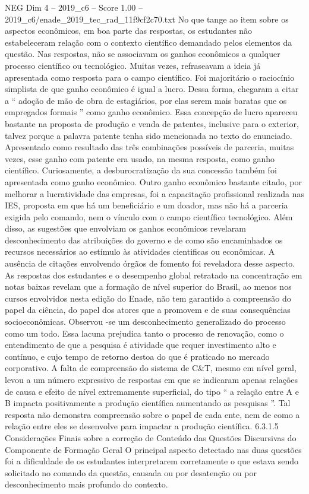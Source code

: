 \begin{textsample}{NEG Dim 4 – 2019\_c6 – Score 1.00 – 2019\_c6/enade\_2019\_tec\_rad\_11f9cf2c70.txt}
No que tange ao item sobre os aspectos econômicos, em boa parte das respostas, os estudantes não estabeleceram relação com o contexto científico demandado pelos elementos da questão.
Nas respostas, não se associavam os ganhos econômicos a qualquer processo científico ou tecnológico.
Muitas vezes, refraseavam a ideia já apresentada como resposta para o campo científico.
Foi majoritário o raciocínio simplista de que ganho econômico é igual a lucro.
Dessa forma, chegaram a citar a “ adoção de mão de obra de estagiários, por elas serem mais baratas que os empregados formais ” como ganho econômico.
Essa concepção de lucro apareceu bastante na proposta de produção e venda de patentes, inclusive para o exterior, talvez porque a palavra patente tenha sido mencionada no texto do enunciado.
Apresentado como resultado das três combinações possíveis de parceria, muitas vezes, esse ganho com patente era usado, na mesma resposta, como ganho científico.
Curiosamente, a desburocratização da sua concessão também foi apresentada como ganho econômico.
Outro ganho econômico bastante citado, por melhorar a lucratividade das empresas, foi a capacitação profissional realizada nas IES, proposta em que há um beneficiário e um doador, mas não há a parceria exigida pelo comando, nem o vínculo com o campo científico tecnológico.
Além disso, as sugestões que envolviam os ganhos econômicos revelaram desconhecimento das atribuições do governo e de como são encaminhados os recursos necessários ao estímulo às atividades cientificas ou econômicas.
A ausência de citações envolvendo órgãos de fomento foi reveladora desse aspecto.
As respostas dos estudantes e o desempenho global retratado na concentração em notas baixas revelam que a formação de nível superior do Brasil, ao menos nos cursos envolvidos nesta edição do Enade, não tem garantido a compreensão do papel da ciência, do papel dos atores que a promovem e de suas consequências socioeconômicas.
Observou -se um desconhecimento generalizado do processo como um todo.
Essa lacuna prejudica tanto o processo de renovação, como o entendimento de que a pesquisa é atividade que requer investimento alto e contínuo, e cujo tempo de retorno destoa do que é praticado no mercado corporativo.
A falta de compreensão do sistema de C\&T, mesmo em nível geral, levou a um número expressivo de respostas em que se indicaram apenas relações de causa e efeito de nível extremamente superficial, do tipo “ a relação entre A e B impacta positivamente a produção científica aumentando as pesquisas ”.
Tal resposta não demonstra compreensão sobre o papel de cada ente, nem de como a relação entre eles se desenvolve para impactar a produção científica. 6.3.1.5 Considerações Finais sobre a correção de Conteúdo das Questões Discursivas do Componente de Formação Geral O principal aspecto detectado nas duas questões foi a dificuldade de os estudantes interpretarem corretamente o que estava sendo solicitado no comando da questão, causada ou por desatenção ou por desconhecimento mais profundo do contexto.

\end{textsample}
